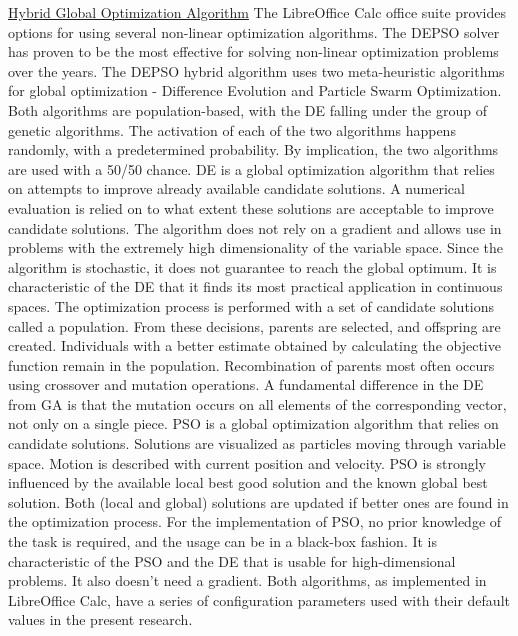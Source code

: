 \documentclass{article}
\begin{document}
\vspace*{2mm}
\underline{Hybrid Global Optimization Algorithm} \hspace*{4mm}
The LibreOffice Calc office suite provides options for using several non-linear optimization algorithms. The DEPSO solver has proven to be the most effective for solving non-linear optimization problems over the years. The DEPSO hybrid algorithm uses two meta-heuristic algorithms for global optimization - Difference Evolution and Particle Swarm Optimization. Both algorithms are population-based, with the DE falling under the group of genetic algorithms. The activation of each of the two algorithms happens randomly, with a predetermined probability. By implication, the two algorithms are used with a 50/50 chance.
%
DE is a global optimization algorithm that relies on attempts to improve already available candidate solutions. A numerical evaluation is relied on to what extent these solutions are acceptable to improve candidate solutions. The algorithm does not rely on a gradient and allows use in problems with the extremely high dimensionality of the variable space. Since the algorithm is stochastic, it does not guarantee to reach the global optimum. It is characteristic of the DE that it finds its most practical application in continuous spaces. The optimization process is performed with a set of candidate solutions called a population. From these decisions, parents are selected, and offspring are created. Individuals with a better estimate obtained by calculating the objective function remain in the population. Recombination of parents most often occurs using crossover and mutation operations. A fundamental difference in the DE from GA is that the mutation occurs on all elements of the corresponding vector, not only on a single piece.
%
PSO is a global optimization algorithm that relies on candidate solutions. Solutions are visualized as particles moving through variable space. Motion is described with current position and velocity. PSO is strongly influenced by the available local best good solution and the known global best solution. Both (local and global) solutions are updated if better ones are found in the optimization process. For the implementation of PSO, no prior knowledge of the task is required, and the usage can be in a black-box fashion. It is characteristic of the PSO and the DE that is usable for high-dimensional problems. It also doesn't need a gradient.
%
Both algorithms, as implemented in LibreOffice Calc, have a series of configuration parameters used with their default values in the present research.
\end{document}
